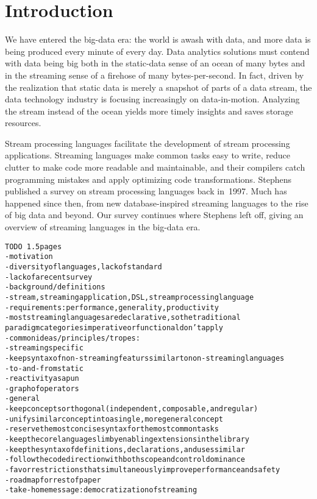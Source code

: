 \section{Introduction}\label{sec:introduction}

We have entered the big-data era: the world is awash with data, and
more data is being produced every minute of every day. Data analytics
solutions must contend with data being big both in the static-data sense of
an ocean of many bytes and in the streaming sense of a firehose of
many bytes-per-second. In fact, driven by the realization that static
data is merely a snapshot of parts of a data stream, the data technology
industry is focusing increasingly on data-in-motion. Analyzing
the stream instead of the ocean yields more timely insights and saves
storage resources.

Stream processing languages facilitate the development of stream
processing applications. Streaming languages make common tasks easy to
write, reduce clutter to make code more readable and maintainable, and
their compilers catch programming mistakes and apply optimizing code
transformations. Stephens published a survey on stream processing
languages back in~1997. Much has happened since then, from new
database-inspired streaming languages to the rise of big data and
beyond. Our survey continues where Stephens left off, giving an
overview of streaming languages in the big-data era.

\begin{alltt}TODO\scriptsize ~1.5 pages
- motivation
  - diversity of languages, lack of standard
  - lack of a recent survey \cite{stephens_1997} \cite{johnston_hanna_millar_2004}
- background / definitions
  - stream, streaming application, DSL, stream processing language
  - requirements: performance, generality, productivity
  - most streaming languages are declarative, so the traditional
    paradigm categories imperative or functional don't apply
- common ideas/principles/tropes:
  - streaming specific
    - keep syntax of non-streaming featurs similar to non-streaming languages
    - to-and-from static
    - reactivity as a pun
    - graph of operators
  - general
    - keep concepts orthogonal (independent, composable, and regular)
    - unify similar concept into a single, more general concept
    - reserve the most concise syntax for the most common tasks
    - keep the core language slim by enabling extensions in the library
    - keep the syntax of definitions, declarations, and uses similar
    - follow the code direction with both scope and control dominance
    - favor restrictions that simultaneously improve performance and safety
- roadmap for rest of paper
- take-home message: democratization of streaming
\end{alltt}
